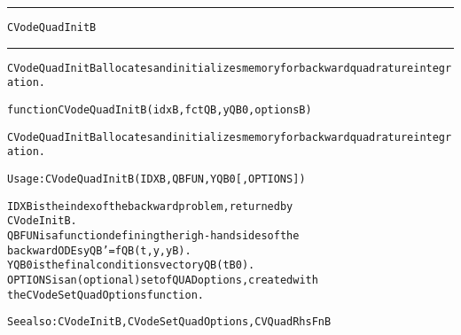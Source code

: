\begin{samepage}
\hrule
\begin{center}
{\large \verb!CVodeQuadInitB!}
\label{p:CVodeQuadInitB}
\end{center}
\hrule\vspace{0.1in}



\begin{alltt}
CVodeQuadInitB allocates and initializes memory for backward quadrature integration.
\end{alltt}

\end{samepage}



\begin{samepage}


\begin{alltt}
function CVodeQuadInitB(idxB, fctQB, yQB0, optionsB) 
\end{alltt}

\end{samepage}



\begin{alltt}
CVodeQuadInitB allocates and initializes memory for backward quadrature integration.

   Usage: CVodeQuadInitB ( IDXB, QBFUN, YQB0 [, OPTIONS ] ) 

   IDXB     is the index of the backward problem, returned by
            CVodeInitB.
   QBFUN    is a function defining the righ-hand sides of the
            backward ODEs yQB' = fQB(t,y,yB).
   YQB0     is the final conditions vector yQB(tB0).
   OPTIONS  is an (optional) set of QUAD options, created with
            the CVodeSetQuadOptions function. 

   See also: CVodeInitB, CVodeSetQuadOptions, CVQuadRhsFnB
\end{alltt}






\vspace{0.1in}